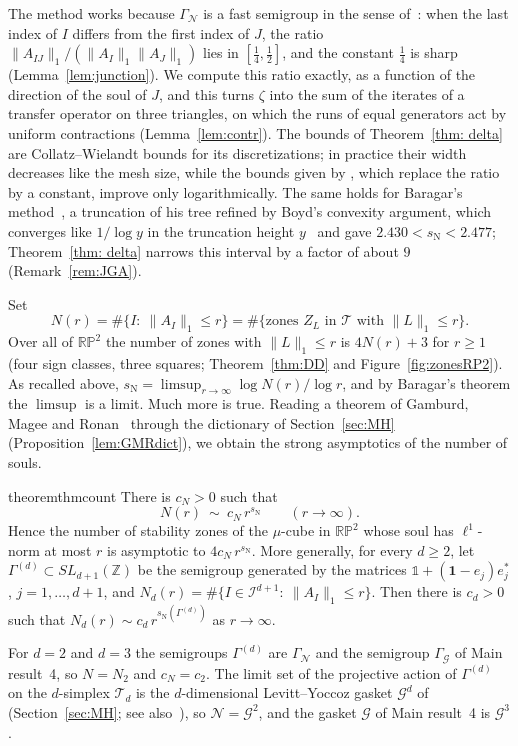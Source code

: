 \documentclass[11pt]{amsart}
\newcommand{\id}{\mathds{1}}
\theoremstyle{definition}
\theoremstyle{remark}
\newcommand{\one}{\mathbf 1}
\newcommand{\Z}{\mathbb Z}
\newcommand{\RP}{\mathbb{RP}}
\newcommand{\cN}{\mathcal N}
\newcommand{\cI}{\mathcal I}
\newcommand{\cT}{\mathcal T}
\newcommand{\GN}{\Gamma_{\mathcal N}}
\newcommand{\cG}{\mathcal G}
\newcommand{\GG}{\Gamma_{\mathcal G}}
\newcommand{\sN}{s_{\mathrm N}}
\newcommand{\norm}[1]{\lVert #1\rVert}
\begin{document}
The method works because $\GN$ is a fast semigroup in the sense of~\cite{DL15JGA}: when the last index of $I$ differs from the first index of $J$, the ratio $\|A_{IJ}\|_1/(\|A_I\|_1\|A_J\|_1)$ lies in $[\frac14,\frac12]$, and the constant $\frac14$ is sharp (Lemma~\ref{lem:junction}).
We compute this ratio exactly, as a function of the direction of the soul of $J$, and this turns $\zeta$ into the sum of the iterates of a transfer operator on three triangles, on which the runs of equal generators act by uniform contractions (Lemma~\ref{lem:contr}).
The bounds of Theorem~\ref{thm: delta} are Collatz--Wielandt bounds for its discretizations; in practice their width decreases like the mesh size, while the bounds given by \cite[Thm.~1]{DL15JGA}, which replace the ratio by a constant, improve only logarithmically. The same holds for Baragar's method~\cite{Bar98}, a truncation of his tree refined by Boyd's convexity argument, which converges like $1/\log y$ in the truncation height $y$~\cite[Thm.~2.3]{Bar98} and gave $2.430<\sN<2.477$; Theorem~\ref{thm: delta} narrows this interval by a factor of about $9$ (Remark~\ref{rem:JGA}).

Set
\[
  N(r)=\#\{I:\ \|A_I\|_1\le r\}
  =\#\{\text{zones }Z_L\text{ in $\cT$ with }\|L\|_1\le r\}.
\]
Over all of $\RP^2$ the number of zones with $\|L\|_1\le r$ is $4N(r)+3$ for $r\ge1$ (four sign classes, three squares; Theorem~\ref{thm:DD} and Figure~\ref{fig:zonesRP2}). As recalled above, $\sN=\limsup_{r\to\infty}\log N(r)/\log r$, and by Baragar's theorem the $\limsup$ is a limit. Much more is true. Reading a theorem of Gamburd, Magee and Ronan~\cite[Thm.~13]{GMR19} through the dictionary of Section~\ref{sec:MH} (Proposition~\ref{lem:GMRdict}), we obtain the strong asymptotics of the number of souls.

\begin{restatable}{theorem}{thmcount}\label{thm:count}
There is $c_N>0$ such that
\[
  N(r)\ \sim\ c_N\,r^{\sN}\qquad(r\to\infty).
\]
Hence the number of stability zones of the $\mu$-cube in $\RP^2$ whose soul has $\ell^1$-norm at most $r$ is asymptotic to $4c_N\,r^{\sN}$. More generally, for every $d\ge2$, let $\Gamma^{(d)}\subset SL_{d+1}(\Z)$ be the semigroup generated by the matrices $\id+(\one-e_j)e_j^*$, $j=1,\dots,d+1$, and $N_d(r)=\#\{I\in\cI^{d+1}:\ \norm{A_I}_1\le r\}$. Then there is $c_d>0$ such that $N_d(r)\sim c_d\,r^{\sN(\Gamma^{(d)})}$ as $r\to\infty$.
\end{restatable}

For $d=2$ and $d=3$ the semigroups $\Gamma^{(d)}$ are $\GN$ and the semigroup $\GG$ of Main result~4, so $N=N_2$ and $c_N=c_2$. The limit set of the projective action of $\Gamma^{(d)}$ on the $d$-simplex $\cT_d$ is the $d$-dimensional Levitt--Yoccoz gasket $\mathcal G^d$ of~\cite{DL08,DL15JGA} (Section~\ref{sec:MH}; see also~\cite{AS13,Fou20}), so $\cN=\mathcal G^2$, and the gasket $\cG$ of Main result~4 is $\mathcal G^3$.
\end{document}
